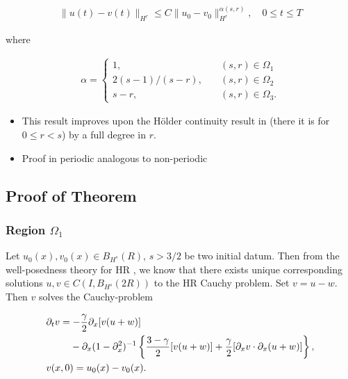 \documentclass[handout]{beamer}
\numberwithin{equation}{section}
\newcommand{\p}{\partial}
\begin{document}
\begin{frame}
    \begin{theorem}

\begin{equation*}
\begin{split}
  \| u(t) - v(t) \|_{H^{r}} \le C \| u_{0} - v_{0} \|_{H^{r}}^{\alpha(s, r)},
  \quad 0
  \le t \le T
\end{split}
\end{equation*}


where 


\begin{equation*}
\begin{split}
\alpha = 
\begin{cases}
   1, \quad & (s,r) \in \Omega_{1} 
  \\
   2(s-1)/(s-r),  \quad & (s, r) \in \Omega_{2}
  \\
   s-r, \quad & (s, r) \in \Omega_{3}.
\end{cases}
\end{split}
\end{equation*}
\end{theorem}

\begin{itemize}
    \item
This result improves upon the H\"older continuity result in
\cite{Chen:2011fk} (there it is for $0 \le r < s$) by a full degree in $r$. 
\item Proof in periodic analogous to non-periodic
\end{itemize}

\end{frame}

\begin{frame}
\section{Proof of Theorem}


\frametitle{Region $\Omega_{1}$} 


Let $u_{0}(x), v_{0}(x)
\in B_{H^{s}}(R)$, $s > 3/2$ be two initial datum. Then from
the well-posedness theory for HR \cite{Karapetyan:2010fk}, we
know that there exists unique corresponding solutions $u, v \in C(I,
B_{H^{s}}(2R))$ to the HR Cauchy problem.
Set $v=u-w$. Then $v$ solves the Cauchy-problem


\begin{align*}
& \p_t v
=  -\frac{\gamma}{2} \p_x [v(u + w)] 
\\
\notag
& \phantom{\p_t v = }-\p_x (1 - \p_{x}^{2})^{-1} \left\{
\frac{3-\gamma}{2}[v(u+w)] + \frac{\gamma}{2}[\p_x v \cdot \p_x (u+w)]
\right\},
\\
& v(x,0) = u_{0}(x) - v_{0}(x).
\end{align*}
\end{frame}
\end{document}
